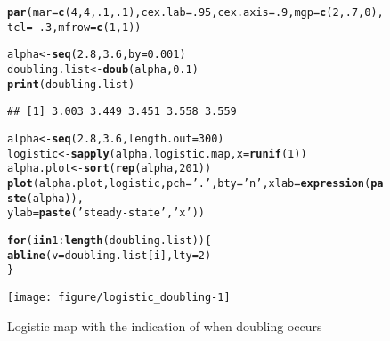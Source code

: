 \documentclass[12pt]{article}\usepackage[]{graphicx}\usepackage[]{color}
\makeatletter
\def\maxwidth{ %
  \ifdim\Gin@nat@width>\linewidth
    \linewidth
  \else
    \Gin@nat@width
  \fi
}
\newcommand{\hlnum}[1]{\textcolor[rgb]{0.686,0.059,0.569}{#1}}%
\newcommand{\hlstr}[1]{\textcolor[rgb]{0.192,0.494,0.8}{#1}}%
\newcommand{\hlopt}[1]{\textcolor[rgb]{0,0,0}{#1}}%
\newcommand{\hlstd}[1]{\textcolor[rgb]{0.345,0.345,0.345}{#1}}%
\newcommand{\hlkwa}[1]{\textcolor[rgb]{0.161,0.373,0.58}{\textbf{#1}}}%
\newcommand{\hlkwb}[1]{\textcolor[rgb]{0.69,0.353,0.396}{#1}}%
\newcommand{\hlkwc}[1]{\textcolor[rgb]{0.333,0.667,0.333}{#1}}%
\newcommand{\hlkwd}[1]{\textcolor[rgb]{0.737,0.353,0.396}{\textbf{#1}}}%
\newenvironment{kframe}{%
 \def\at@end@of@kframe{}%
 \ifinner\ifhmode%
  \def\at@end@of@kframe{\end{minipage}}%
  \begin{minipage}{\columnwidth}%
 \fi\fi%
 \def\FrameCommand##1{\hskip\@totalleftmargin \hskip-\fboxsep
 \colorbox{shadecolor}{##1}\hskip-\fboxsep
     \hskip-\linewidth \hskip-\@totalleftmargin \hskip\columnwidth}%
 \MakeFramed {\advance\hsize-\width
   \@totalleftmargin\z@ \linewidth\hsize
   \@setminipage}}%
 {\par\unskip\endMakeFramed%
 \at@end@of@kframe}
\newenvironment{knitrout}{}{} %
\makeatother
\begin{document}
\newpage
\begin{figure}
\begin{center}
\begin{knitrout}
\color{fgcolor}\begin{kframe}
\begin{alltt}
\hlkwd{par}\hlstd{(}\hlkwc{mar}\hlstd{=}\hlkwd{c}\hlstd{(}\hlnum{4}\hlstd{,}\hlnum{4}\hlstd{,}\hlnum{.1}\hlstd{,}\hlnum{.1}\hlstd{),}\hlkwc{cex.lab}\hlstd{=}\hlnum{.95}\hlstd{,}\hlkwc{cex.axis}\hlstd{=}\hlnum{.9}\hlstd{,}\hlkwc{mgp}\hlstd{=}\hlkwd{c}\hlstd{(}\hlnum{2}\hlstd{,}\hlnum{.7}\hlstd{,}\hlnum{0}\hlstd{),}\hlkwc{tcl}\hlstd{=}\hlopt{-}\hlnum{.3}\hlstd{,} \hlkwc{mfrow}\hlstd{=}\hlkwd{c}\hlstd{(}\hlnum{1}\hlstd{,} \hlnum{1}\hlstd{))}

\hlstd{alpha} \hlkwb{<-} \hlkwd{seq}\hlstd{(}\hlnum{2.8}\hlstd{,} \hlnum{3.6}\hlstd{,} \hlkwc{by} \hlstd{=} \hlnum{0.001}\hlstd{)}
\hlstd{doubling.list} \hlkwb{<-} \hlkwd{doub}\hlstd{(alpha,} \hlnum{0.1}\hlstd{)}
\hlkwd{print}\hlstd{(doubling.list)}
\end{alltt}
\begin{verbatim}
## [1] 3.003 3.449 3.451 3.558 3.559
\end{verbatim}
\begin{alltt}
\hlstd{alpha} \hlkwb{<-} \hlkwd{seq}\hlstd{(}\hlnum{2.8}\hlstd{,} \hlnum{3.6}\hlstd{,} \hlkwc{length.out} \hlstd{=} \hlnum{300}\hlstd{)}
\hlstd{logistic} \hlkwb{<-} \hlkwd{sapply}\hlstd{(alpha, logistic.map,} \hlkwc{x} \hlstd{=} \hlkwd{runif}\hlstd{(}\hlnum{1}\hlstd{))}
\hlstd{alpha.plot} \hlkwb{<-} \hlkwd{sort}\hlstd{(}\hlkwd{rep}\hlstd{(alpha,} \hlnum{201}\hlstd{))}
\hlkwd{plot}\hlstd{(alpha.plot, logistic,} \hlkwc{pch} \hlstd{=} \hlstr{'.'}\hlstd{,} \hlkwc{bty} \hlstd{=} \hlstr{'n'}\hlstd{,} \hlkwc{xlab} \hlstd{=} \hlkwd{expression}\hlstd{(}\hlkwd{paste}\hlstd{(alpha)),}
     \hlkwc{ylab} \hlstd{=} \hlkwd{paste}\hlstd{(}\hlstr{'steady-state'}\hlstd{,}\hlstr{'x'}\hlstd{))}

\hlkwa{for} \hlstd{(i} \hlkwa{in} \hlnum{1}\hlopt{:}\hlkwd{length}\hlstd{(doubling.list))\{}
  \hlkwd{abline}\hlstd{(}\hlkwc{v} \hlstd{= doubling.list[i],} \hlkwc{lty} \hlstd{=} \hlnum{2}\hlstd{)}
\hlstd{\}}
\end{alltt}
\end{kframe}
\texttt{[image: figure/logistic\_doubling-1]} 

\end{knitrout}
\caption{Logistic map with the indication of when doubling occurs}
\label{fig:seven}
\end{center}
\end{figure}
\end{document}
